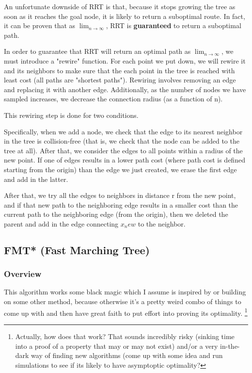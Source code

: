\documentclass[a4paper]{article}
\begin{document}
An unfortunate downside of RRT is that, because it stops growing the tree as
soon as it reaches the goal node, it is likely to return a suboptimal route. In
fact, it can be proven that as $\lim_{n\to \infty}$, RRT is \textbf{guaranteed} to return a suboptimal path. 

In order to guarantee that RRT will return an optimal path as $\lim_{n\to
\infty}$, we must introduce a "rewire" function. For each point we put down, we
will rewire it and its neighbors to make sure that the each point in the tree is
reached with least cost (all paths are "shortest paths"). Rewiring involves
removing an edge and replacing it with another edge. Additionally, as the number
of nodes we have sampled increases, we decrease the connection radius (as a
function of n).

This rewiring step is done for two conditions.

Specifically, when we add a node, we check that the edge to its nearest neighbor
in the tree is collision-free (that is, we check that the node can be added to
the tree at all). After that, we consider the edges to all points within a
radius of the new point. If one of edges results in a lower path cost (where
path cost is defined starting from the origin) than the edge we just created, we
erase the first edge and add in the latter. 

After that, we try all the edges to neighbors in distance r from the new point,
and if that new path to the neighboring edge results in a smaller cost than the
current path to the neighboring edge (from the origin), then we deleted the
parent and add in the edge connecting $x_new$ to the neighbor.


\subsection{FMT* (Fast Marching Tree)}

\subsubsection{Overview}
This algorithm works some black magic which I assume is inspired by or building
on some other method, because otherwise it's a pretty weird combo of things to come up with
and then have great faith to put effort into proving its optimality. \footnote{Actually,
how does that work? That sounds incredibly risky (sinking time into a proof of a
property that may or may not exist) and/or a very in-the-dark way
of finding new algorithms (come up with some idea and run simulations to see if
its likely to have asymptoptic optimality?}
\end{document}

